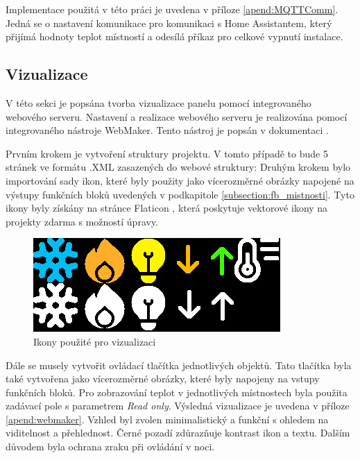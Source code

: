 Implementace použitá v této práci je uvedena v příloze \ref{apend:MQTTComm}. Jedná se o nastavení komunikace pro komunikaci s Home Assistantem, který přijímá hodnoty teplot místností a odesílá příkaz pro celkové vypnutí instalace. 
\subsection{Vizualizace}
V této sekci je popsána tvorba vizualizace panelu pomocí integrovaného webového serveru. Nastavení a realizace webového serveru je realizována pomocí integrovaného nástroje WebMaker. Tento nástroj je popsán v dokumentaci \cite{WebMaker}.

Prvním krokem je vytvoření struktury projektu. V tomto případě to bude 5 stránek ve formátu .XML zasazených do webové struktury:
\vspace{0.3cm}
Druhým krokem bylo importování sady ikon, které byly použity jako vícerozměrné obrázky napojené na výstupy funkčních bloků uvedených v podkapitole \ref{subsection:fb_mistnosti}. Tyto ikony byly získány na stránce Flaticon \cite{Flaticon}, která poskytuje vektorové ikony na projekty zdarma s možností úpravy. 

\begin{figure}[!ht]
    \begin{center}
        \includegraphics[scale=0.6]{obrazky/Ikonky.png}
    \end{center}
    \caption[Ikony použité pro vizualizaci]{Ikony použité pro vizualizaci}
    \label{fig:ikony}
\end{figure}

Dále se musely vytvořit ovládací tlačítka jednotlivých objektů. Tato tlačítka byla také vytvořena jako vícerozměrné obrázky, které byly napojeny na vstupy funkčních bloků. Pro zobrazování teplot v jednotlivých místnostech byla použita zadávací pole s parametrem \textit{Read only}. 
Výsledná vizualizace je uvedena v příloze \ref{apend:webmaker}. Vzhled byl zvolen minimalistický a funkční s ohledem na viditelnost a přehlednost. Černé pozadí zdůrazňuje kontrast ikon a textu. Dalším důvodem byla ochrana zraku při ovládání v noci.